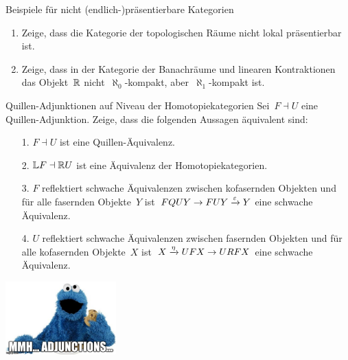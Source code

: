 \documentclass{uebblatt}
\begin{document}
\begin{aufgabe}{Beispiele für nicht (endlich-)präsentierbare Kategorien}
\begin{enumerate}
\item Zeige, dass die Kategorie der topologischen Räume nicht lokal präsentierbar
ist.
\item Zeige, dass in der Kategorie der Banachräume und linearen Kontraktionen
das Objekt~$\mathbb{R}$ nicht~$\aleph_0$-kompakt, aber~$\aleph_1$-kompakt ist.
\end{enumerate}
\end{aufgabe}

\begin{aufgabe}{Quillen-Adjunktionen auf Niveau der Homotopiekategorien}
Sei~$F \dashv U$ eine Quillen-Adjunktion. Zeige, dass
die folgenden Aussagen äquivalent sind:
\begin{itemize}
\item[1.] $F \dashv U$ ist eine Quillen-Äquivalenz.
\item[2.] $\mathbb{L} F \dashv \mathbb{R} U$ ist eine Äquivalenz der Homotopiekategorien.
\item[3.] $F$ reflektiert schwache Äquivalenzen zwischen kofasernden Objekten und
für alle fasernden Objekte~$Y$ ist~$FQUY \to FUY \xrightarrow{\varepsilon} Y$ eine schwache
Äquivalenz.
\item[4.] $U$ reflektiert schwache Äquivalenzen zwischen fasernden Objekten und
für alle kofasernden Objekte~$X$ ist~$X \xrightarrow{\eta} UFX \to URFX$ eine schwache
Äquivalenz.
\end{itemize}
\end{aufgabe}
\enlargethispage{1.2cm}

\centering
\includegraphics[height=2.8cm]{images/mmh-adjunctions-cookie-monster}
\par
\end{document}
